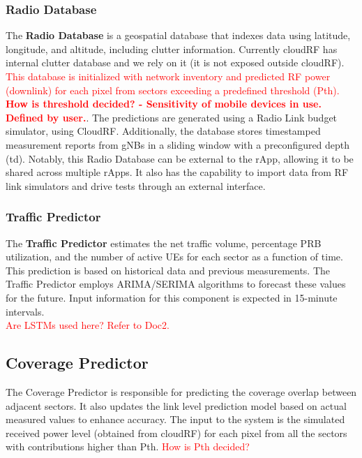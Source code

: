 \documentclass[conference]{IEEEtran}
\begin{document}
\subsubsection{Radio Database}

The \textbf{Radio Database} is a geospatial database that indexes data using latitude, longitude, and altitude, including clutter information. Currently cloudRF has internal clutter database and we rely on it (it is not exposed outside cloudRF). \textcolor{red}{This database is initialized with network inventory and predicted RF power (downlink) for each pixel from sectors exceeding a predefined threshold (Pth). \textbf{How is threshold decided? - Sensitivity of mobile devices in use. Defined by user.}}. The predictions are generated using a Radio Link budget simulator, using CloudRF. Additionally, the database stores timestamped measurement reports from gNBs in a sliding window with a preconfigured depth (td). Notably, this Radio Database can be external to the rApp, allowing it to be shared across multiple rApps. It also has the capability to import data from RF link simulators and drive tests through an external interface. \\

\subsubsection{Traffic Predictor}

The \textbf{Traffic Predictor} estimates the net traffic volume, percentage PRB utilization, and the number of active UEs for each sector as a function of time. This prediction is based on historical data and previous measurements. The Traffic Predictor employs ARIMA/SERIMA algorithms to forecast these values for the future. Input information for this component is expected in 15-minute intervals. \\

\textcolor{red}{Are LSTMs used here? Refer to Doc2.}

\subsection{Coverage Predictor}

The Coverage Predictor is responsible for predicting the coverage overlap between adjacent sectors. It also updates the link level prediction model based on actual measured values to enhance accuracy. The input to the system is the simulated received power level (obtained from cloudRF) for each pixel from all the sectors with contributions higher than Pth. \textcolor{red}{How is Pth decided?} \\
\end{document}
